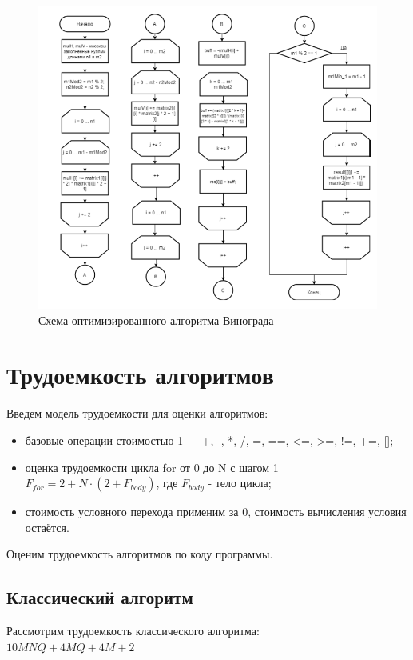 \documentclass[12pt]{report}
\begin{document}
\begin{figure}[pt]
\centering
\includegraphics[scale=1]{alg3.png}
\caption{Схема оптимизированного алгоритма Винограда}
\label{fig:mpr}
\end{figure}

\newpage
\section{Трудоемкость алгоритмов}
Введем модель трудоемкости для оценки алгоритмов: 
\begin{itemize}
	\item базовые операции стоимостью 1 — +, -, *, /, =, ==, <=, >=, !=, +=, [];
	\item оценка трудоемкости цикла for от 0 до N с шагом 1 $F_{for} = 2 + N \cdot (2 + F_{body})$, где $F_{body}$ - тело цикла;
	\item стоимость условного перехода применим за 0, стоимость вычисления условия остаётся.
\end{itemize}

Оценим трудоемкость алгоритмов по коду программы.

\subsection{Классический алгоритм}
Рассмотрим трудоемкость классического алгоритма:\\

$10MNQ + 4MQ + 4 M + 2$ \\
\end{document}
